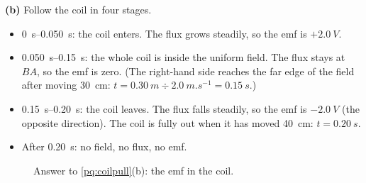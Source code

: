 \begin{practiceanswers}
\begin{practiceans}
  \textbf{(b)} Follow the coil in four stages.
  \begin{itemize}
    \item \qtyrange{0}{0.050}{s}: the coil enters. The flux grows steadily, so the emf is
          $+\qty{2.0}{V}$.
    \item \qtyrange{0.050}{0.15}{s}: the whole coil is inside the uniform field. The flux
          stays at $BA$, so the emf is zero. (The right-hand side reaches the far edge of
          the field after moving \qty{30}{cm}:
          $t = \qty{0.30}{m} \div \qty{2.0}{m.s^{-1}} = \qty{0.15}{s}$.)
    \item \qtyrange{0.15}{0.20}{s}: the coil leaves. The flux falls steadily, so the emf is
          $-\qty{2.0}{V}$ (the opposite direction). The coil is fully out when it has moved
          \qty{40}{cm}: $t = \qty{0.20}{s}$.
    \item After \qty{0.20}{s}: no field, no flux, no emf.
  \end{itemize}
  \begin{figure}
    \centering
    \caption*{Answer to \cref{pq:coilpull}(b): the emf in the coil.}
  \end{figure}


\end{practiceans}
\end{practiceanswers}
